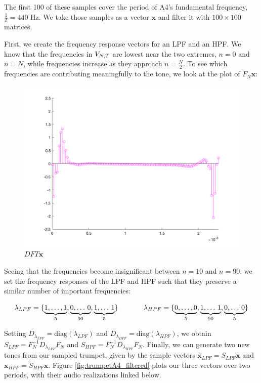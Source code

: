 \par \bigskip The first 100 of these samples cover the period of A4's fundamental frequency, $\frac{1}{T} = 440$ Hz. We take those samples as a vector $\mathbf{x}$ and filter it with $100\times 100$ matrices.

\par \bigskip First, we create the frequency response vectors for an LPF and an HPF. We know that the frequencies in $V_{N,T}$ are lowest near the two extremes, $n = 0$ and $n = N$, while frequencies increase as they approach $n = \frac{N}{2}$.\cite{Ryan} To see which frequencies are contributing meaningfully to the tone, we look at the plot of $F_N\mathbf{x}$:

\begin{figure}[h]
    \centering
    \includegraphics[scale=.16]{DFT_trumpetA4.png}
    \caption{$DFT\mathbf{x}$}
    \label{fig:DFT_trumpetA4}
\end{figure}

\par Seeing that the frequencies become insignificant between $n = 10$ and $n = 90$, we set the frequency responses of the LPF and HPF such that they preserve a similar number of important frequencies:

$$\lambda_{LPF} = \{\underbrace{1,\dots,1}_{5},\underbrace{0,\dots\,0}_{90},\underbrace{1,\dots\,1}_{5}\} \hspace{.5in} \lambda_{HPF} = \{\underbrace{0,\dots,0}_{5},\underbrace{1,\dots\,1}_{90},\underbrace{0,\dots\,0}_{5}\}$$

\par \bigskip Setting $D_{\lambda_{LPF}} = \text{diag}(\lambda_{LPF})$ and $D_{\lambda_{HPF}} = \text{diag}(\lambda_{HPF})$, we obtain $S_{LPF} = F_N^{-1}D_{\lambda_{LPF}}F_N$ and $S_{HPF} = F_N^{-1}D_{\lambda_{HPF}}F_N$. Finally, we can generate two new tones from our sampled trumpet, given by the sample vectors $\mathbf{x}_{LPF} = S_{LPF}\mathbf{x}$ and $\mathbf{x}_{HPF} = S_{HPF}\mathbf{x}$. Figure \ref{fig:trumpetA4_filtered} plots our three vectors over two periods, with their audio realizations linked below.


